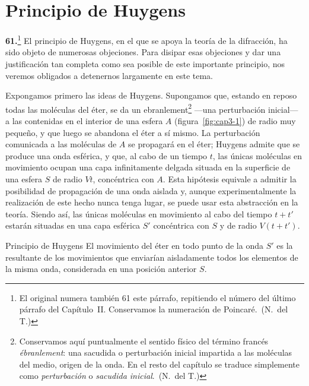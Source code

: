 \chapter{Principio de Huygens}
\label{cap:huygens}

\noindent\textbf{61.}\footnote{El original numera también 61 este párrafo,
repitiendo el número del último párrafo del Capítulo~II. Conservamos la
numeración de Poincaré.~(N.~del T.)} El principio de Huygens, en el que se apoya la teoría
de la difracción, ha sido objeto de numerosas objeciones. Para disipar esas
objeciones y dar una justificación tan completa como sea posible de este
importante principio, nos veremos obligados a detenernos largamente en este
tema.

Expongamos primero las ideas de Huygens. Supongamos que, estando en reposo
todas las moléculas del éter, se da un ebranlement\footnote{Conservamos aquí
puntualmente el sentido físico del término francés \emph{ébranlement}: una
sacudida o perturbación inicial impartida a las moléculas del medio, origen
de la onda. En el resto del capítulo se traduce simplemente como
\emph{perturbación} o \emph{sacudida inicial}.~(N.~del T.)} —una perturbación inicial—
a las contenidas en el interior de una esfera $A$ (figura~\ref{fig:cap3-1})
de radio muy pequeño, y que luego se abandona el éter a sí mismo. La
perturbación comunicada a las moléculas de $A$ se propagará en el éter;
Huygens admite que se produce una onda esférica, y que, al cabo de un tiempo
$t$, las únicas moléculas en movimiento ocupan una capa infinitamente
delgada situada en la superficie de una esfera $S$ de radio $Vt$,
concéntrica con $A$. Esta hipótesis equivale a admitir la posibilidad de
propagación de una onda aislada y, aunque experimentalmente la realización
de este hecho nunca tenga lugar, se puede usar esta abstracción en la
teoría. Siendo así, las únicas moléculas en movimiento al cabo del tiempo
$t+t'$ estarán situadas en una capa esférica $S'$ concéntrica con $S$ y de
radio $V(t+t')$.

\begin{enunciado}{Principio de Huygens}
El movimiento del éter en todo punto de la onda $S'$ es la resultante de
los movimientos que enviarían aisladamente todos los elementos de la misma
onda, considerada en una posición anterior $S$.
\end{enunciado}

